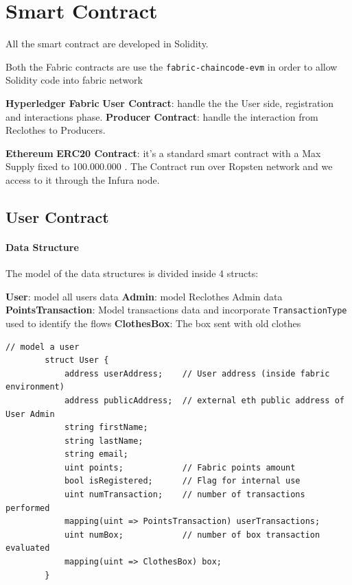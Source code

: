{\section{Smart Contract}

All the smart contract are developed in Solidity. 

Both the Fabric contracts are use the \texttt{fabric-chaincode-evm} in order to allow Solidity code into fabric network

\begin{outline}[enumerate]
    \1 \textbf{Hyperledger Fabric}
    \2 \textbf{User Contract}: handle the the User side, registration and interactions phase.
    \2 \textbf{Producer Contract}: handle the interaction from Reclothes to Producers.
    
    \1 \textbf{Ethereum}
    \2 \textbf{ERC20 Contract}: it's a standard smart contract with a Max Supply fixed to 100.000.000 .
    The Contract run over Ropsten network and we access to it through the Infura node.
\end{outline}

\subsection{User Contract} 

\paragraph{Data Structure}
The model of the data structures is divided inside 4 structs:

\begin{outline}[enumerate]
    \1 \textbf{User}: model all users data
    \1 \textbf{Admin}: model Reclothes Admin data
    \1 \textbf{PointsTransaction}: Model transactions data and incorporate \texttt{TransactionType} used to identify the flows
    \1 \textbf{ClothesBox}: The box sent with old clothes 
\end{outline}

\begin{lstlisting}[language=Solidity]
        // model a user
        struct User {
            address userAddress;    // User address (inside fabric environment)
            address publicAddress;  // external eth public address of User Admin
            string firstName;
            string lastName;
            string email;
            uint points;            // Fabric points amount
            bool isRegistered;      // Flag for internal use
            uint numTransaction;    // number of transactions performed
            mapping(uint => PointsTransaction) userTransactions;
            uint numBox;            // number of box transaction evaluated
            mapping(uint => ClothesBox) box;
        }
    

\end{lstlisting}}
